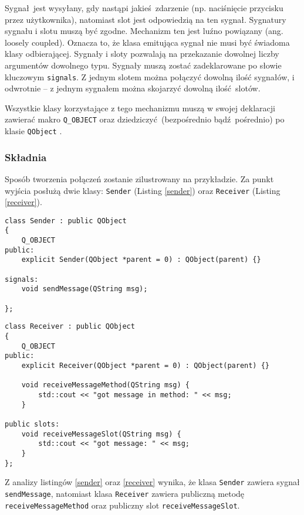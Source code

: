 Sygnał jest wysyłany, gdy nastąpi jakieś zdarzenie (np. naciśnięcie przycisku przez użytkownika), natomiast slot jest odpowiedzią na ten sygnał. Sygnatury sygnału i slotu muszą być zgodne. Mechanizm ten jest luźno powiązany (ang. loosely coupled). Oznacza to, że klasa emitująca sygnał nie musi być świadoma klasy odbierającej. Sygnały i sloty pozwalają na przekazanie dowolnej liczby argumentów dowolnego typu. Sygnały muszą zostać zadeklarowane po słowie kluczowym \lstinline$signals$. Z jednym slotem można połączyć dowolną ilość sygnałów, i odwrotnie -- z jednym sygnałem można skojarzyć dowolną ilość slotów.

Wszystkie klasy korzystające z tego mechanizmu muszą w swojej deklaracji zawierać makro \lstinline$Q_OBJECT$ oraz dziedziczyć (bezpośrednio bądź pośrednio) po klasie \lstinline$QObject$ \cite{Qtdoc}.


\subsubsection{Składnia} 
Sposób tworzenia połączeń zostanie zilustrowany na przykładzie. Za punkt wyjścia posłużą dwie klasy: \lstinline$Sender$ (Listing \ref{sender}) oraz \lstinline$Receiver$ (Listing \ref{receiver}).

\begin{minipage}{\textwidth}
	\begin{lstlisting}[label=sender,caption=Klasa Sender]
class Sender : public QObject
{
	Q_OBJECT
public:
	explicit Sender(QObject *parent = 0) : QObject(parent) {}
	
signals:
	void sendMessage(QString msg);
	
};
	\end{lstlisting}
\end{minipage}

\begin{minipage}{\textwidth}
	\begin{lstlisting}[label=receiver, caption=Klasa Receiver]
class Receiver : public QObject
{
	Q_OBJECT
public:
	explicit Receiver(QObject *parent = 0) : QObject(parent) {}
	
	void receiveMessageMethod(QString msg) {
		std::cout << "got message in method: " << msg;
	}
	
public slots:
	void receiveMessageSlot(QString msg) {
		std::cout << "got message: " << msg;
	}
};
	\end{lstlisting}
\end{minipage}

Z analizy listingów \ref{sender} oraz \ref{receiver} wynika, że klasa \lstinline{Sender} zawiera sygnał \lstinline{sendMessage}, natomiast klasa \lstinline{Receiver} zawiera publiczną metodę \lstinline{receiveMessageMethod} oraz publiczny slot \lstinline{receiveMessageSlot}.


